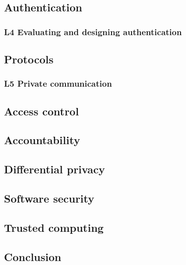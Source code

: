 {\subsection{Authentication}%
\label{authentication}


\subsubsection{L4 Evaluating and designing authentication}%
\label{pwdeval}


\subsection{Protocols}%
\label{protocols}


\subsubsection{L5 Private communication}%
\label{pricomlab}


\subsection{Access control}%
\label{ac}


\subsection{Accountability}%
\label{accountability}


\subsection{Differential privacy}%
\label{diffpriv}


\subsection{Software security}%
\label{software}


\subsection{Trusted computing}%
\label{trustcomp}


\subsection{Conclusion}%
\label{conclusion}

}
